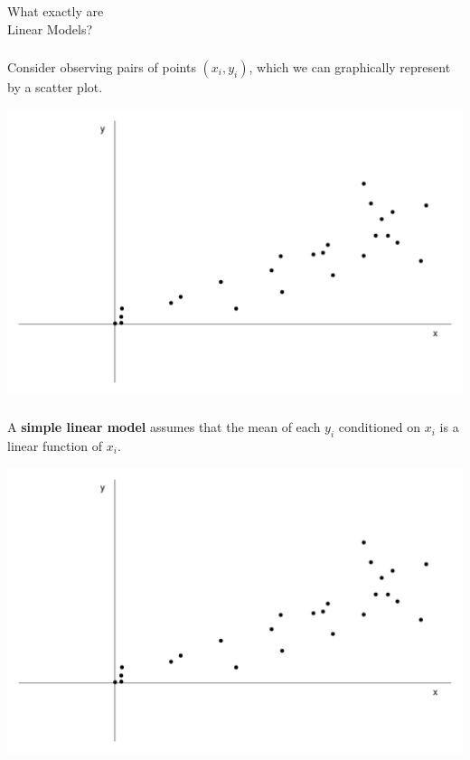 \begin{frame}[fragile] \frametitle{}

\begin{flushright}
{\color{yaleblue}\sc\fontsize{1cm}{1.2cm}\selectfont What exactly are \\\medskip Linear Models?}
\end{flushright}

\end{frame}

\begin{frame}[fragile] \frametitle{}

Consider observing pairs of points $(x_i,y_i)$, which we
can graphically represent by a scatter plot.

\vfill

\includegraphics[width=0.9\linewidth]{img/fig01.pdf}

\end{frame}

\begin{frame}[fragile] \frametitle{}

A {\bf simple linear model} assumes that the mean of each
$y_i$ conditioned on $x_i$ is a linear function of $x_i$.

\vfill

\includegraphics[width=0.9\linewidth]{img/fig01.pdf}

\end{frame}

